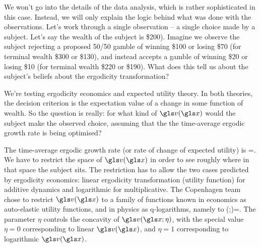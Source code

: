 We won't go into the details of the data analysis, which is rather sophisticated in this case. Instead, 
we will only explain the logic behind what was done with the observations. 
Let's work through a single observation -- a single choice made by a subject. 
Let's say the wealth of the 
subject is \$200). Imagine we observe the subject rejecting
a proposed 50/50 gamble of winning \$100 or losing \$70 (for terminal wealth \$300 or \$130), 
and instead accepts a gamble of winning \$20 or losing \$10 (for terminal  wealth \$220 or \$190). 
What does this tell us about the subject's beliefs about the ergodicity transformation?

We're testing ergodicity economics and expected utility theory. In both theories, the decision criterion
is the expectation value of a change in some function of wealth. So the question is really:
for what kind of $\gv(\x)$ would the subject make the observed choice, assuming that the
the time-average ergodic growth rate is being optimised?

The time-average ergodic growth rate (or rate of change of expected utility) is
\be
\g=\frac{\ave{\D \gv(\x)}}{\D\t}.
\ee
We have to restrict the space of $\gv(\x)$ in order to see roughly where 
in that space the subject sits. The restriction has to allow the two cases
predicted by ergodicity economics: linear ergodicity transformation (utility function) 
for additive dynamics and logarithmic for multiplicative.
The Copenhagen team chose to restrict $\gv(\x)$ to
a family of functions known in economics as auto-elastic utility functions, and in 
physics as q-logarithms, namely to
\be
\gv(\x;\eta)=.
\ee
The parameter $\eta$ controls the concavity of $\gv(\x; \eta)$, with the special value
$\eta=0$ corresponding to linear $\gv(\x)$, and $\eta=1$ corresponding to logarithmic $\gv(\x)$.

